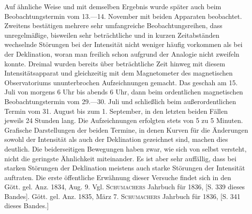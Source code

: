 \expandafter\def\csname HistoricalNoteText371\endcsname{Auf ähnliche Weise und mit demselben Ergebnis wurde später auch beim Beobachtungstermin vom 13.---14. November mit beiden Apparaten beobachtet.}
Zweitens bestätigen mehrere sehr umfangreiche Beobachtungsreihen, dass unregelmäßige, bisweilen sehr beträchtliche und in kurzen Zeitabständen wechselnde Störungen bei der Intensität nicht weniger häufig vorkommen als bei der Deklination, woran man freilich schon aufgrund der Analogie nicht zweifeln konnte. Dreimal wurden bereits über beträchtliche Zeit hinweg mit diesem Intensitätsapparat und gleichzeitig mit dem Magnetometer des magnetischen Observatoriums ununterbrochen Aufzeichnungen gemacht. Das geschah am 15. Juli von morgens 6 Uhr bis abends 6 Uhr, dann beim ordentlichen magnetischen Beobachtungstermin vom 29.---30. Juli und schließlich beim außerordentlichen Termin vom 31. August bis zum 1. September, in den letzten beiden Fällen jeweils 24 Stunden lang. Die Aufzeichnungen erfolgten stets von 5 zu 5 Minuten. Grafische Darstellungen der beiden Termine, in denen Kurven für die Änderungen sowohl der Intensität als auch der Deklination gezeichnet sind, machen dies deutlich. Die beiderseitigen Bewegungen haben zwar, wie sich von selbst versteht, nicht die geringste Ähnlichkeit miteinander. Es ist aber sehr auffällig, dass bei starken Störungen der Deklination meistens auch starke Störungen der Intensität auftraten.
\expandafter\def\csname HistoricalNoteText376\endcsname{Die erste öffentliche Erwähnung dieser Versuche findet sich in den Gött. gel. Anz. 1834, Aug. 9. Vgl. \textsc{Schumachers} Jahrbuch für 1836, [S. 339 dieses Bandes].}
\expandafter\def\csname HistoricalNoteText376b\endcsname{Gött. gel. Anz. 1835, März 7. \textsc{Schumachers} Jahrbuch für 1836, [S. 341 dieses Bandes.]}
\par
